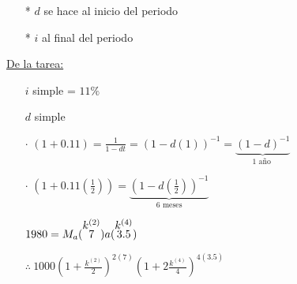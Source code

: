 \color{blue}
\begin{itemize}
\item[*] $d$ se hace al inicio del periodo
\item[*] $i$ al final del periodo
\end{itemize}
\color{black}
\uline{De la tarea:}
\begin{itemize}
\item[\circled{13}] $i$ simple = $11\%$

$d$ simple
\item[$\cdot$] $(1+0.11) = \frac{1}{1-dt} = \left( 1 -d(1)\right)^{-1} = \underbrace{(1-d)^{-1}}_{\text{1 año }} $
\item[$\cdot$] $\left( 1+0.11\left(\frac{1}{2} \right) \right)  = \underbrace{\left(1-d\left(\frac{1}{2} \right)  \right)^{-1}}_{\text{6 meses}} $
\item[\circled{30}] $1980 = M_a( \mathrel{\stackon[1.5pt]{$7$}{$k^{(2)}$}})a(\mathrel{\stackon[1.5pt]{$3.5$}{$k^{(4)}$}})$

$\therefore \: 1000\left( 1 + \frac{k^{(2)}}{2}\right)^{2(7)} \left(1 + 2\frac{k^{(4)}}{4} \right)^{4(3.5)}  $
\end{itemize}
\newpage
\color{blue}
\color{black}
